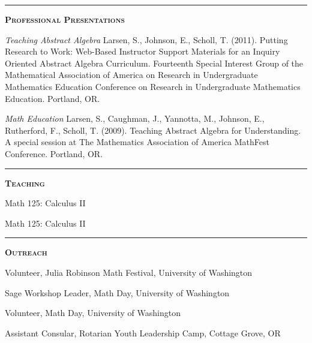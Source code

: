 \documentclass[12pt]{article}
\newcommand{\sectionheading}[1]
{
\bigskip %
\noindent
\hspace{-6.5mm}\textcolor{Gray}{\rule[.75mm]{21.5mm}{1mm}} %
\hspace{.2mm}	%
{\large{\textbf{\textsc{#1}}}} %
}
\newenvironment{date_section}
	{
	\vspace{-1ex}
	\leftmargini = 15ex
		\begin{itemize}[
			labelsep = *,
			labelwidth = 9ex,
			labelindent = 0ex,
			itemindent = !,
			font=\normalfont,
			align=parleft
		]{}
		\itemsep=-1.5mm
	}
	{\end{itemize}\vspace{-2ex}}
\newcommand{\yearmo}[2]{
	\item[
		{\makebox[1ex][r]{#1}}
		\hspace{1ex}
		{\makebox[1ex][l]{#2} }
		] }
\begin{document}
	\sectionheading{Professional Presentations}%

		\begin{date_section}

			\yearmo{2011}{} %
				\emph{Teaching Abstract Algebra}
				Larsen, S., Johnson, E., Scholl, T. (2011).
				Putting Research to Work: Web-Based Instructor
				Support Materials for an Inquiry Oriented
				Abstract Algebra Curriculum. Fourteenth Special
				Interest Group of the Mathematical Association
				of America on Research in Undergraduate
				Mathematics Education Conference on Research
				in Undergraduate Mathematics Education.
				Portland, OR.

			\yearmo{2009}{} %
				\emph{Math Education}
				Larsen, S., Caughman, J., Yannotta, M.,
				Johnson, E., Rutherford, F., Scholl, T.
				(2009). Teaching Abstract Algebra for
				Understanding. A special session at The
				Mathematics Association of America MathFest
				Conference. Portland, OR.

		\end{date_section}

	\sectionheading{Teaching}%

		\begin{date_section}

			\yearmo{2015}{}%
				Math 125: Calculus II

			\yearmo{2014}{}%
				Math 125: Calculus II

		\end{date_section}

	\sectionheading{Outreach}%

			\begin{date_section}

				\yearmo{2015}{}
					Volunteer,
					Julia Robinson Math Festival,
					University of Washington

				\yearmo{2015}{}
					Sage Workshop Leader,
					Math Day,
					University of Washington

				\yearmo{2014}{}
					Volunteer,
					Math Day,
					University of Washington

				\yearmo{2010}{}
					Assistant Consular,
					Rotarian Youth Leadership Camp,
					Cottage Grove, OR

			\end{date_section}


\end{document}

